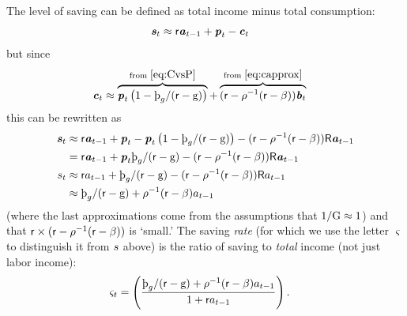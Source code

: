 \documentclass{scrartcl}
\begin{document}
The level of saving can be defined as total income minus total consumption:
\begin{equation}\begin{gathered}\begin{aligned}
  \boldsymbol{\mathit{s}}_{t} & \approx  \mathsf{r} \boldsymbol{\mathit{a}}_{t-1} + \boldsymbol{\mathit{p}}_{t} - \boldsymbol{\mathit{c}}_{t}
\end{aligned}\end{gathered}\end{equation}
but since 
\begin{equation}\begin{gathered}\begin{aligned}
  \label{eq:cFromHandB}
  \cLvl_{t} & \approx  \overbrace{\pLvl_{t} \left(1 - \GPRte/(\rfree - \WGroRte)\right)}^{\text{from }\eqref{eq:CvsP}}+\overbrace{(\rfree-\CRRA^{-1}(\rfree-\DiscFac))\bLvl_{t}}^{\text{from }\eqref{eq:capprox}}
\end{aligned}\end{gathered}\end{equation}
this can be rewritten as
\begin{equation}\begin{gathered}\begin{aligned}
 \sLvl_{t} & \approx  \rfree \aLvl_{t-1} + \pLvl_{t}- \pLvl_{t} \left(1 - \GPRte/(\rfree - \WGroRte)\right) - (\rfree-\CRRA^{-1}(\rfree-\DiscFac))\Rfree \aLvl_{t-1}
\\ & =  \rfree \aLvl_{t-1} + \pLvl_{t} \GPRte/(\rfree - \WGroRte)- (\rfree-\CRRA^{-1}(\rfree-\DiscFac))\Rfree\aLvl_{t-1}
\\ \sNrm_{t} & \approx  \rfree \aNrm_{t-1} + \GPRte/(\rfree - \WGroRte)- (\rfree-\CRRA^{-1}(\rfree-\DiscFac))\Rfree \aNrm_{t-1}
\\ & \approx  \GPRte/(\rfree - \WGroRte)+ \CRRA^{-1}(\rfree-\DiscFac)\aNrm_{t-1}
\end{aligned}\end{gathered}\end{equation}
(where the last approximations come from the assumptions that $1/\mathrm{G} \approx 1$) and that $\mathsf{r} \times (\mathsf{r}-\rho^{-1}(\mathsf{r}-\beta))$ is `small.'
The saving \textit{rate} (for which we use the letter $\varsigma$ to distinguish it from $s$ above) is the ratio of saving to \textit{total} income (not just labor income):
\begin{equation}\begin{gathered}\begin{aligned}
\varsigma_{t} & =  \left(\frac{\GPRte/(\rfree - \WGroRte)+ \CRRA^{-1}(\rfree-\DiscFac)\aNrm_{t-1}}{1+ \rfree \aNrm_{t-1}}\right).
\end{aligned}\end{gathered}\end{equation}
\end{document}
